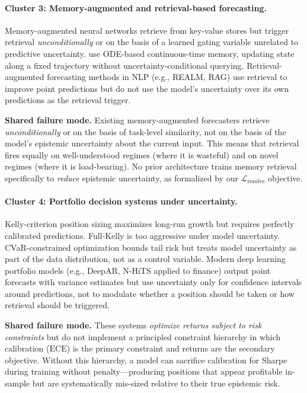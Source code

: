 \documentclass[11pt,a4paper]{article}
\newcommand{\Lres}{\mathcal{L}_{\mathrm{resolve}}}
\newcommand{\ECE}{\mathrm{ECE}}
\begin{document}
\paragraph{Cluster 3: Memory-augmented and retrieval-based forecasting.}
Memory-augmented neural networks \citep{graves2014neural} retrieve from
key-value stores but trigger retrieval \emph{unconditionally} or on the basis
of a learned gating variable unrelated to predictive uncertainty.
\citet{le2020neuralode} use ODE-based continuous-time memory, updating state
along a fixed trajectory without uncertainty-conditional querying.
Retrieval-augmented forecasting methods in NLP (e.g., REALM, RAG) use
retrieval to improve point predictions but do not use the model's uncertainty
over its own predictions as the retrieval trigger.

\textbf{Shared failure mode.}
Existing memory-augmented forecasters retrieve \emph{unconditionally} or
on the basis of task-level similarity, not on the basis of the model's
epistemic uncertainty about the current input.  This means that retrieval
fires equally on well-understood regimes (where it is wasteful) and on
novel regimes (where it is load-bearing).  No prior architecture trains
memory retrieval specifically to \emph{reduce} epistemic uncertainty,
as formalized by our $\Lres$ objective.

\paragraph{Cluster 4: Portfolio decision systems under uncertainty.}
Kelly-criterion position sizing \citep{kelly1956new} maximizes long-run growth
but requires perfectly calibrated predictions.  Full-Kelly is too aggressive
under model uncertainty.  CVaR-constrained optimization
\citep{rockafellar2000optimization} bounds tail risk but treats model
uncertainty as part of the data distribution, not as a control variable.
Modern deep learning portfolio models (e.g., DeepAR, N-HiTS applied to
finance) output point forecasts with variance estimates but use uncertainty
only for confidence intervals around predictions, not to modulate whether
a position should be taken or how retrieval should be triggered.

\textbf{Shared failure mode.}
These systems \emph{optimize returns subject to risk constraints} but do not
implement a principled constraint hierarchy in which calibration ($\ECE$) is
the primary constraint and returns are the secondary objective.  Without this
hierarchy, a model can sacrifice calibration for Sharpe during training
without penalty—producing positions that appear profitable in-sample but are
systematically mis-sized relative to their true epistemic risk.
\end{document}
